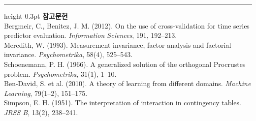 \documentclass[10pt]{article}
\begin{document}
\vspace{0.6em}
\hrule height 0.3pt
\vspace{0.5em}
{\footnotesize
\textbf{참고문헌}\\[0.3em]
Bergmeir, C., Benitez, J. M. (2012). On the use of cross-validation for time
series predictor evaluation. \emph{Information Sciences}, 191, 192--213.\\[0.15em]
Meredith, W. (1993). Measurement invariance, factor analysis and factorial
invariance. \emph{Psychometrika}, 58(4), 525--543.\\[0.15em]
Schoenemann, P. H. (1966). A generalized solution of the orthogonal Procrustes
problem. \emph{Psychometrika}, 31(1), 1--10.\\[0.15em]
Ben-David, S. et al. (2010). A theory of learning from different domains.
\emph{Machine Learning}, 79(1--2), 151--175.\\[0.15em]
Simpson, E. H. (1951). The interpretation of interaction in contingency tables.
\emph{JRSS B}, 13(2), 238--241.
}
\end{document}

